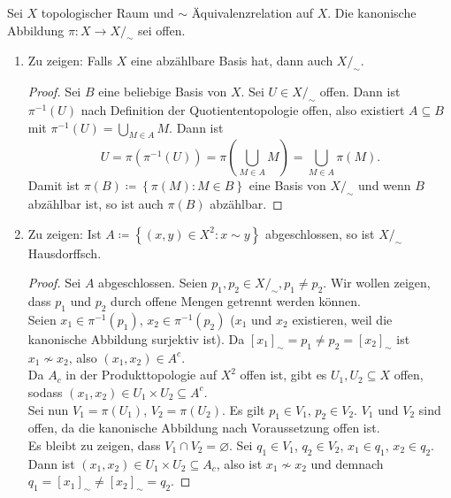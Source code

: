 \begin{problem*}[4]
  Sei \( X \) topologischer Raum und \( \sim \) Äquivalenzrelation auf \( X \). Die kanonische Abbildung \( \pi : X \to X/_\sim \) sei offen.
  \begin{enumerate}
    \item Zu zeigen: Falls \( X \) eine abzählbare Basis hat, dann auch \( X/_\sim \).
    \begin{proof}
      Sei \( B \) eine beliebige Basis von \( X \). Sei \( U \in X/_\sim \) offen. Dann ist \( \pi^{-1}(U) \) nach Definition der Quotiententopologie offen, also existiert \( A \subseteq B \) mit \( \pi^{-1}(U) = \bigcup_{M \in A}M \). Dann ist
      \begin{equation*}
        U = \pi(\pi^{-1}(U)) = \pi\left(\bigcup_{M \in A} M \right) = \bigcup_{M \in A} \pi(M)\text{.}
      \end{equation*}
      Damit ist \( \pi(B) \coloneqq \left \{ \pi(M): M \in B \right \} \) eine Basis von \( X/_\sim \) und wenn \( B \) abzählbar ist, so ist auch \( \pi(B) \) abzählbar.
    \end{proof}
    
    \item Zu zeigen: Ist \( A \coloneqq \left \{ (x,y) \in X^2 : x \sim y \right \} \) abgeschlossen, so ist \( X/_\sim \) Hausdorffsch.
    \begin{proof}
      Sei \( A \) abgeschlossen. Seien \( p_1, p_2 \in X/_\sim, p_1 \neq p_2 \). Wir wollen zeigen, dass \( p_1 \) und \( p_2 \) durch offene Mengen getrennt werden können. \\
      Seien \( x_1 \in \pi^{-1}(p_1) \), \( x_2 \in \pi^{-1}(p_2) \) (\( x_1 \) und \( x_2 \) existieren, weil die kanonische Abbildung surjektiv ist). Da \( {[x_1]}_\sim = p_1 \neq p_2 = {[x_2]}_\sim \) ist \( x_1 \not \sim x_2 \), also \( (x_1, x_2) \in A^c \). \\
      Da \( A_c \) in der Produkttopologie auf \( X^2 \) offen ist, gibt es \( U_1, U_2 \subseteq X \) offen, sodass \( (x_1, x_2) \in U_1 \times U_2 \subseteq A^c \). \\
      Sei nun \( V_1 = \pi(U_1) \), \( V_2 = \pi(U_2) \). Es gilt \( p_1 \in V_1 \), \( p_2 \in V_2 \). \( V_1 \) und \( V_2 \) sind offen, da die kanonische Abbildung nach Voraussetzung offen ist. \\
      Es bleibt zu zeigen, dass \( V_1 \cap V_2 = \varnothing \). Sei \( q_1 \in V_1 \), \( q_2 \in V_2 \), \( x_1 \in q_1 \), \( x_2 \in q_2 \). Dann ist \( (x_1, x_2) \in U_1 \times U_2 \subseteq A_c \), also ist \( x_1 \not \sim x_2 \) und demnach \( q_1 = {[x_1]}_\sim \neq {[x_2]}_\sim = q_2 \).
    \end{proof}
  \end{enumerate}
\end{problem*}



